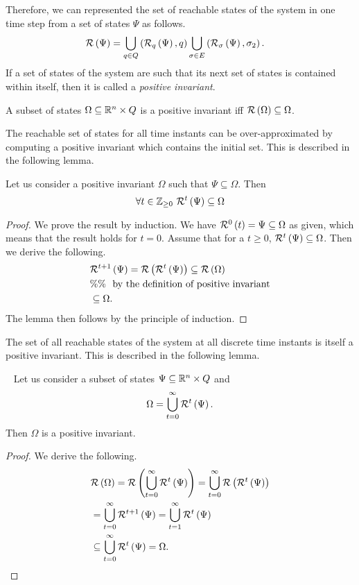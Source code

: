 %
Therefore, we can represented the set of reachable states of the
system in one time step from a set of states $\Psi$ as follows.
%
\begin{align*}
& \mathcal{R}\left(\Psi\right)=\bigcup_{q\in Q}\left(\mathcal{R}_{q}\left(\Psi\right),q\right)\bigcup_{\sigma\in E}\left(\mathcal{R}_{\sigma}\left(\Psi\right),\sigma_2\right).
\end{align*}
%
If a set of states of the system are such that its next set of states
is contained within itself, then it is called a {\it positive invariant}.
%
\begin{definition}
A subset of states $\Omega\subseteq\mathbb{R}^n\times Q$ is a
positive invariant iff $\mathcal{R}\left(\Omega\right)\subseteq\Omega$.
\end{definition}
%
The reachable set of states for all time instants can be
over-approximated by computing a positive invariant which contains the
initial set.  This is described in the following lemma.
%
\begin{lemma}
Let us consider a positive invariant $\Omega$ such that
$\Psi\subseteq\Omega$.  Then 
%
\[
\forall t\in\mathbb{Z}_{\geq 0}~\mathcal{R}^{t}\left(\Psi\right)\subseteq\Omega
\]
%
\end{lemma}
%
\begin{proof}
We prove the result by induction.  We have
$\mathcal{R}^{0}\left(t\right)=\Psi\subseteq\Omega$ as given, which means that the
result holds for $t=0$.  Assume that for a $t\geq 0$,
$\mathcal{R}^{t}\left(\Psi\right)\subseteq\Omega$.  Then we derive the following.
%
\begin{align*}
&
\mathcal{R}^{t+1}\left(\Psi\right)=\mathcal{R}\left(\mathcal{R}^{t}\left(\Psi\right)\right)\subseteq\mathcal{R}\left(\Omega\right)\\
& \%\%~~\text{by the definition of positive invariant}\\
& \subseteq \Omega.
\end{align*}
%
The lemma then follows by the principle of induction.
\end{proof}
%
The set of all reachable states of the system at all discrete time
instants is itself a positive invariant.  This is described in the
following lemma.
%
\begin{lemma}~\label{lem:exact-pi}
Let us consider a subset of states
$\Psi\subseteq\mathbb{R}^n\times Q$ and
%
\[
\Omega=\bigcup_{t=0}^\infty\mathcal{R}^{t}\left(\Psi\right).
\]
%
Then $\Omega$ is a positive invariant.
\end{lemma}
%
\begin{proof}
We derive the following.
%
\begin{align*}
& \mathcal{R}\left(\Omega\right)=\mathcal{R}\left(\bigcup_{t=0}^\infty\mathcal{R}^{t}\left(\Psi\right)\right) = \bigcup_{t=0}^\infty\mathcal{R}\left(\mathcal{R}^{t}\left(\Psi\right)\right)\\
& = \bigcup_{t=0}^\infty\mathcal{R}^{t+1}\left(\Psi\right)= \bigcup_{t=1}^\infty\mathcal{R}^{t}\left(\Psi\right)\\
& \subseteq  \bigcup_{t=0}^\infty\mathcal{R}^{t}\left(\Psi\right)=\Omega.\hspace{3em}\qedhere
\end{align*}
%
\end{proof}
%






















